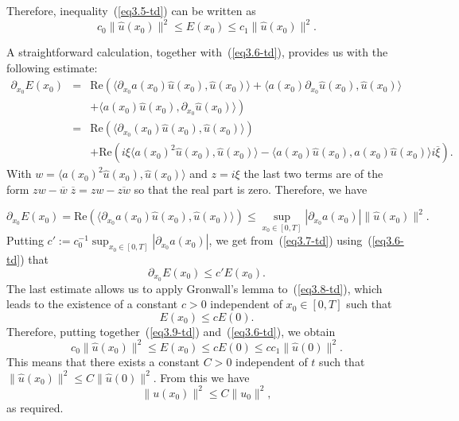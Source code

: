 \documentclass[12pt]{amsart}
\theoremstyle{definition}
\begin{document}
Therefore, inequality~(\ref{eq3.5-td}) can be written as
\begin{equation}
c_0 \|\hat{u}(x_0)\|^2 \leq E(x_0) \leq c_1 \|\hat{u}(x_0)\|^2.
\label{eq3.6-td}
\end{equation}

A straightforward calculation, together with~(\ref{eq3.6-td}), provides us with the following estimate:
\begin{eqnarray*}
\partial_{x_0}E(x_0) & = & \mathrm{Re}\left(\langle \partial_{x_0}a(x_0)\hat{u}(x_0), \hat{u}(x_0) \rangle + \langle a(x_0)\partial_{x_0}\hat{u}(x_0), \hat{u}(x_0)\right. \rangle\\
&&  \left. + \langle a(x_0)\hat{u}(x_0), \partial_{x_0}\hat{u}(x_0) \rangle \right)\\
& = & \mathrm{Re}\left(\langle \partial_{x_0}(x_0)\hat{u}(x_0), \hat{u}(x_0) \rangle \right)\\
&& +  \mathrm{Re}\left(i\xi\langle a(x_0)^2\hat{u}(x_0), \hat{u}(x_0) \rangle - \langle a(x_0)\hat{u}(x_0), a(x_0)\hat{u}(x_0) \rangle i\overline{\xi}\right).
\end{eqnarray*}
With $w=\langle a(x_0)^2\hat{u}(x_0), \hat{u}(x_0) \rangle$ and $z=i\xi$ the last two terms are of the form $zw-\overline{w}\;\overline{z}=zw-\overline{zw}$ so that the real part is zero. Therefore, we have

\begin{equation}
\partial_{x_0}E(x_0)=\mathrm{Re}\left(\langle \partial_{x_0}a(x_0)\hat{u}(x_0), \hat{u}(x_0) \rangle \right)\leq \sup_{x_0 \in [0,T]} |\partial_{x_0}a(x_0)| \|\hat{u}(x_0)\|^2.
\label{eq3.7-td}
\end{equation}
Putting $c' := c_0^{-1} \sup_{x_0 \in [0,T]} |\partial_{x_0}a(x_0)|$, we get from~(\ref{eq3.7-td}) using~(\ref{eq3.6-td}) that
\begin{equation}
\partial_{x_0}E(x_0)  \leq c'E(x_0).
\label{eq3.8-td}
\end{equation}
The last estimate allows us to apply Gronwall's lemma to~(\ref{eq3.8-td}), which leads to the existence of a constant $c > 0$ independent of $x_0 \in [0, T]$ such that
\begin{equation}
E(x_0) \leq cE(0).\label{eq3.9-td}
\end{equation}
Therefore, putting together~(\ref{eq3.9-td}) and~(\ref{eq3.6-td}), we obtain
\begin{equation*}
c_0\|\hat{u}(x_0)\|^2 \leq E(x_0) \leq cE(0) \leq cc_1\|\hat{u}(0)\|^2.
\end{equation*}
This means that there exists a constant $C > 0$ independent of $t$ such that $\|\hat{u}(x_0)\|^2 \leq C\|\hat{u}(0)\|^2$. From this we have
\begin{equation*}
\|u(x_0)\|^2  \leq C\|u_0\|^2,
\end{equation*}
as required.
\end{document}
